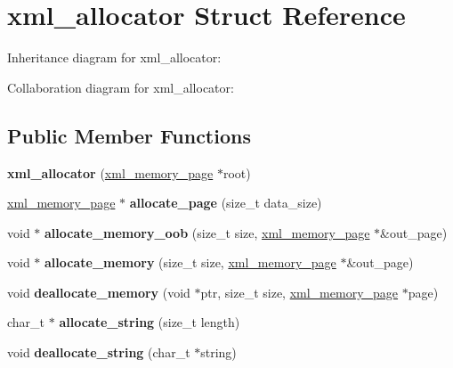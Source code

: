 \hypertarget{structxml__allocator}{}\section{xml\+\_\+allocator Struct Reference}
\label{structxml__allocator}


Inheritance diagram for xml\+\_\+allocator\+:


Collaboration diagram for xml\+\_\+allocator\+:
\subsection*{Public Member Functions}
\begin{DoxyCompactItemize}
\item 
\hypertarget{structxml__allocator_ad41b1a18595953aa71a470b45921c0fd}{}{\bfseries xml\+\_\+allocator} (\hyperlink{structxml__memory__page}{xml\+\_\+memory\+\_\+page} $\ast$root)\label{structxml__allocator_ad41b1a18595953aa71a470b45921c0fd}

\item 
\hypertarget{structxml__allocator_a4b399b01e530220ec5849b912b84063b}{}\hyperlink{structxml__memory__page}{xml\+\_\+memory\+\_\+page} $\ast$ {\bfseries allocate\+\_\+page} (size\+\_\+t data\+\_\+size)\label{structxml__allocator_a4b399b01e530220ec5849b912b84063b}

\item 
\hypertarget{structxml__allocator_a30bb557bc040de54c041c6d3dca6772e}{}void $\ast$ {\bfseries allocate\+\_\+memory\+\_\+oob} (size\+\_\+t size, \hyperlink{structxml__memory__page}{xml\+\_\+memory\+\_\+page} $\ast$\&out\+\_\+page)\label{structxml__allocator_a30bb557bc040de54c041c6d3dca6772e}

\item 
\hypertarget{structxml__allocator_afac0b9fac2c2962972f60d0346eb4f39}{}void $\ast$ {\bfseries allocate\+\_\+memory} (size\+\_\+t size, \hyperlink{structxml__memory__page}{xml\+\_\+memory\+\_\+page} $\ast$\&out\+\_\+page)\label{structxml__allocator_afac0b9fac2c2962972f60d0346eb4f39}

\item 
\hypertarget{structxml__allocator_a5df417155487cce4e0460b123ac33dc6}{}void {\bfseries deallocate\+\_\+memory} (void $\ast$ptr, size\+\_\+t size, \hyperlink{structxml__memory__page}{xml\+\_\+memory\+\_\+page} $\ast$page)\label{structxml__allocator_a5df417155487cce4e0460b123ac33dc6}

\item 
\hypertarget{structxml__allocator_ac5ec2b5d41672d6494a2742e95e525b3}{}char\+\_\+t $\ast$ {\bfseries allocate\+\_\+string} (size\+\_\+t length)\label{structxml__allocator_ac5ec2b5d41672d6494a2742e95e525b3}

\item 
\hypertarget{structxml__allocator_af32c538db4d562c2d0bfe15f7c0aa879}{}void {\bfseries deallocate\+\_\+string} (char\+\_\+t $\ast$string)\label{structxml__allocator_af32c538db4d562c2d0bfe15f7c0aa879}

\end{DoxyCompactItemize}
